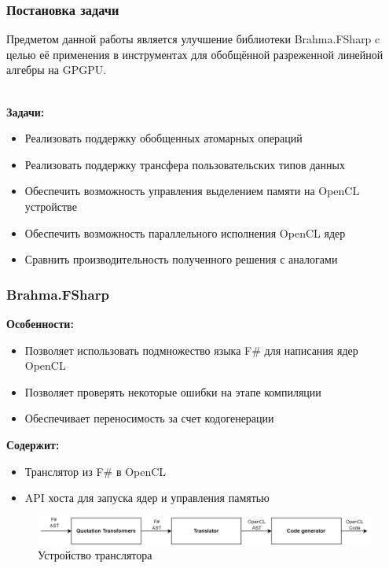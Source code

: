 \documentclass[aspectratio=169]{beamer}
\begin{document}
\begin{frame}
  \frametitle{Постановка задачи}
    Предметом данной работы является улучшение библиотеки
Brahma.FSharp c целью её применения в инструментах для обобщённой
разреженной линейной алгебры на GPGPU.

  ~\\
  \textbf{Задачи:}
  \begin{itemize}
    \item Реализовать поддержку обобщенных атомарных операций
    \item Реализовать поддержку трансфера пользовательских типов данных
    \item Обеспечить возможность управления выделением памяти на OpenCL устройстве
    \item Обеспечить возможность параллельного исполнения OpenCL ядер
    \item Сравнить производительность полученного решения с аналогами
  \end{itemize}
\end{frame}

\begin{frame}
    \frametitle{Brahma.FSharp}
    
\textbf{Особенности:}
    \begin{itemize}
        \item Позволяет использовать подмножество языка F\# для написания ядер OpenCL
        \item Позволяет проверять некоторые ошибки на этапе компиляции
        \item Обеспечивает переносимость за счет кодогенерации
    \end{itemize}
    
\bigskip
    
    \textbf{Содержит:}
    \begin{itemize}
        \item Транслятор из F\# в OpenCL
        \item API хоста для запуска ядер и управления памятью
    \end{itemize}
    
        \begin{figure}[h!]
\centering
\includegraphics[scale=0.25]{pictures/Transl.drawio (2).png}
\caption{Устройство транслятора}
\end{figure}
\end{frame}
\end{document}
